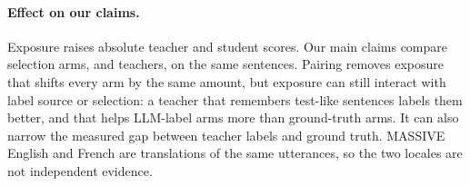 \documentclass[11pt]{article}
\begin{document}
\paragraph{Effect on our claims.} Exposure raises absolute teacher and student scores. Our main claims compare selection arms, and teachers, on the same sentences. Pairing removes exposure that shifts every arm by the same amount, but exposure can still interact with label source or selection: a teacher that remembers test-like sentences labels them better, and that helps LLM-label arms more than ground-truth arms. It can also narrow the measured gap between teacher labels and ground truth. MASSIVE English and French are translations of the same utterances, so the two locales are not independent evidence.
\end{document}
